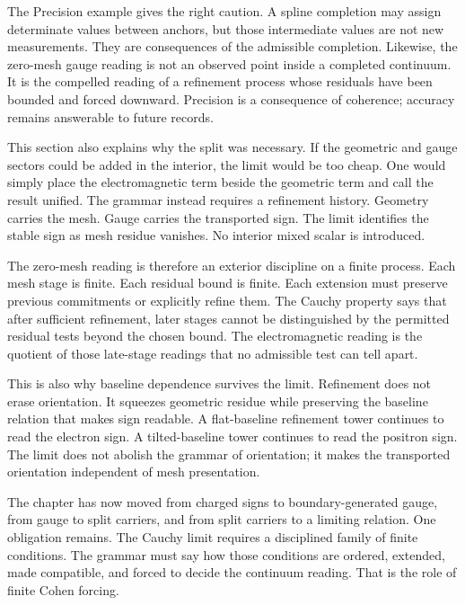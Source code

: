 The Precision example gives the right caution. A spline completion may
assign determinate values between anchors, but those intermediate values are
not new measurements. They are consequences of the admissible completion.
Likewise, the zero-mesh gauge reading is not an observed point inside a
completed continuum. It is the compelled reading of a refinement process
whose residuals have been bounded and forced downward. Precision is a
consequence of coherence; accuracy remains answerable to future records.

This section also explains why the split was necessary. If the geometric and
gauge sectors could be added in the interior, the limit would be too cheap.
One would simply place the electromagnetic term beside the geometric term
and call the result unified. The grammar instead requires a refinement
history. Geometry carries the mesh. Gauge carries the transported sign. The
limit identifies the stable sign as mesh residue vanishes. No interior mixed
scalar is introduced.

The zero-mesh reading is therefore an exterior discipline on a finite
process. Each mesh stage is finite. Each residual bound is finite. Each
extension must preserve previous commitments or explicitly refine them. The
Cauchy property says that after sufficient refinement, later stages cannot
be distinguished by the permitted residual tests beyond the chosen bound.
The electromagnetic reading is the quotient of those late-stage readings
that no admissible test can tell apart.

This is also why baseline dependence survives the limit. Refinement does
not erase orientation. It squeezes geometric residue while preserving the
baseline relation that makes sign readable. A flat-baseline refinement tower
continues to read the electron sign. A tilted-baseline tower continues to
read the positron sign. The limit does not abolish the grammar of
orientation; it makes the transported orientation independent of mesh
presentation.

The chapter has now moved from charged signs to boundary-generated gauge,
from gauge to split carriers, and from split carriers to a limiting
relation. One obligation remains. The Cauchy limit requires a disciplined
family of finite conditions. The grammar must say how those conditions are
ordered, extended, made compatible, and forced to decide the continuum
reading. That is the role of finite Cohen forcing.

